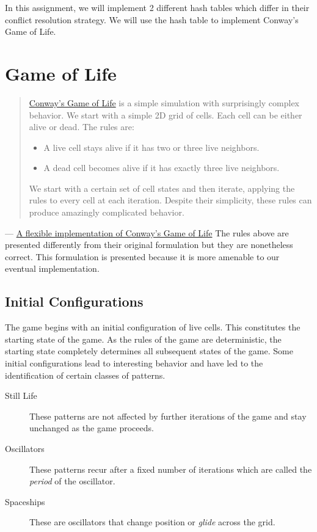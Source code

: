 \documentclass[addpoints]{exam}
\begin{document}
In this assignment, we will implement 2 different hash tables which differ in their conflict resolution strategy. We will use the hash table to implement Conway's Game of Life.

\section{Game of Life}
\label{sec:imgops}

\begin{quotation}
\href{https://en.wikipedia.org/wiki/Conway's_Game_of_Life}{Conway’s Game of Life} is a simple simulation with surprisingly complex behavior. We start with a simple 2D grid of cells. Each cell can be either alive or dead. The rules are:
\begin{itemize}
\item A live cell stays alive if it has two or three live neighbors.
\item A dead cell becomes alive if it has exactly three live neighbors.
\end{itemize}
We start with a certain set of cell states and then iterate, applying the rules to every cell at each iteration. Despite their simplicity, these rules can produce amazingly complicated behavior.
\end{quotation}
\raggedleft --- \href{https://www.refsmmat.com/posts/2016-01-25-conway-game-of-life.html}{A flexible implementation of Conway's Game of Life}
\justify
The rules above are presented differently from their original formulation but they are nonetheless correct. This formulation is presented because it is more amenable to our eventual implementation.

\subsection{Initial Configurations}

The game begins with an initial configuration of live cells. This constitutes the starting state of the game. As the rules of the game are deterministic, the starting state completely determines all subsequent states of the game. Some initial configurations lead to interesting behavior and have led to the identification of certain classes of patterns.
\begin{description}
\item[Still Life] These patterns are not affected by further iterations of the game and stay unchanged as the game proceeds.
\item[Oscillators] These patterns recur after a fixed number of iterations which are called the \textit{period} of the oscillator.
\item[Spaceships] These are oscillators that change position or \textit{glide} across the grid.
\end{description}
\end{document}

